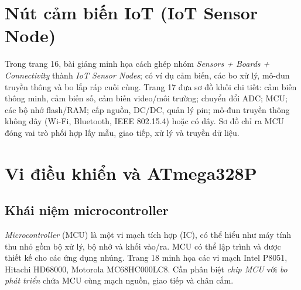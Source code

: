 \section{Nút cảm biến IoT (IoT Sensor Node)}
Trong trang 16, bài giảng minh họa cách ghép nhóm \emph{Sensors + Boards + Connectivity} thành \emph{IoT Sensor Nodes}; có ví dụ cảm biến, các bo xử lý, mô-đun truyền thông và bo lắp ráp cuối cùng. Trang 17 đưa sơ đồ khối chi tiết: cảm biến thông minh, cảm biến số, cảm biến video/môi trường; chuyển đổi ADC; MCU; các bộ nhớ flash/RAM; cấp nguồn, DC/DC, quản lý pin; mô-đun truyền thông không dây (Wi-Fi, Bluetooth, IEEE 802.15.4) hoặc có dây. Sơ đồ chỉ ra MCU đóng vai trò phối hợp lấy mẫu, giao tiếp, xử lý và truyền dữ liệu.
\begin{center}\end{center}
\section{Vi điều khiển và ATmega328P}
\subsection{Khái niệm microcontroller}
\emph{Microcontroller} (MCU) là một vi mạch tích hợp (IC), có thể hiểu như máy tính thu nhỏ gồm bộ xử lý, bộ nhớ và khối vào/ra. MCU có thể lập trình và được thiết kế cho các ứng dụng nhúng. Trang 18 minh họa các vi mạch Intel P8051, Hitachi HD68000, Motorola MC68HC000LC8. Cần phân biệt \emph{chip MCU} với \emph{bo phát triển} chứa MCU cùng mạch nguồn, giao tiếp và chân cắm.
